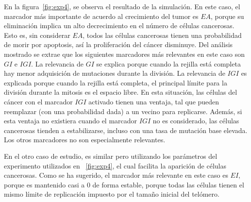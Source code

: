 En la figura~\ref{fig:exp4}, se observa el resultado de la simulación. En este caso, el marcador
más importante de acuerdo al crecimiento del tumor es $EA$,
porque su eliminación implica un alto decrecimiento en el número de células cancerosas.
Esto es, sin considerar $EA$, todos las células cancerosas tienen una probabilidad de morir
por apoptosis, así la proliferación del cáncer disminuye. Del análisis mostrado se extrae
que los siguientes marcadores más relevantes en este caso son $GI$ e $IGI$. La relevancia de $GI$
se explica porque cuando la rejilla está completa hay menor adquisición de mutaciones durante la división.
La relevancia de $IGI$ es explicada porque cuando la rejilla está completa, el principal
límite para la división durante la mitosis es el espacio libre. En esta situación,
las células del cáncer con el marcador $IGI$ activado tienen una ventaja,
tal que pueden reemplazar (con una probabilidad dada) a un vecino para replicarse.
Además, si esta ventaja no existiera cuando el marcador $IGI$ no es considerado, las células
cancerosas tienden a estabilizarse, incluso con una tasa de mutación base elevada.
Los otros marcadores no son especialmente relevantes.

En el otro caso de estudio, es similar pero utilizando los parámetros del experimento utilizados en ~\ref{fig:exp4},
el cual facilita la aparición de células cancerosas. Como se ha sugerido, el marcador más relevante en este caso
es $EI$, porque es mantenido casi a $0$ de forma estable, porque todas las células tienen el mismo límite de replicación
impuesto por el tamaño inicial del telómero.

